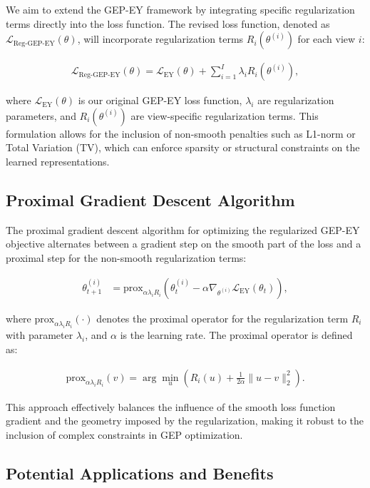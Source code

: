 We aim to extend the GEP-EY framework by integrating specific regularization terms directly into the loss function. The revised loss function, denoted as $\mathcal{L}_{\text{Reg-GEP-EY}}(\theta)$, will incorporate regularization terms $R_i(\theta^{(i)})$ for each view $i$:

\begin{align}
    \mathcal{L}_{\text{Reg-GEP-EY}}(\theta) = \mathcal{L}_{\text{EY}}(\theta) + \sum_{i=1}^I \lambda_i R_i(\theta^{(i)}),
\end{align}

where $\mathcal{L}_{\text{EY}}(\theta)$ is our original GEP-EY loss function, $\lambda_i$ are regularization parameters, and $R_i(\theta^{(i)})$ are view-specific regularization terms. This formulation allows for the inclusion of non-smooth penalties such as L1-norm or Total Variation (TV), which can enforce sparsity or structural constraints on the learned representations.

\subsection{Proximal Gradient Descent Algorithm}

The proximal gradient descent algorithm for optimizing the regularized GEP-EY objective alternates between a gradient step on the smooth part of the loss and a proximal step for the non-smooth regularization terms:

\begin{align}
\theta^{(i)}_{t+1} &= \text{prox}_{\alpha \lambda_i R_i}\left(\theta^{(i)}_t - \alpha \nabla_{\theta^{(i)}} \mathcal{L}_{\text{EY}}(\theta_t)\right),
\end{align}

where $\text{prox}_{\alpha \lambda_i R_i}(\cdot)$ denotes the proximal operator for the regularization term $R_i$ with parameter $\lambda_i$, and $\alpha$ is the learning rate. The proximal operator is defined as:

\begin{align}
\text{prox}_{\alpha \lambda_i R_i}(v) = \arg \min_u \left( R_i(u) + \frac{1}{2\alpha} \|u - v\|_2^2 \right).
\end{align}

This approach effectively balances the influence of the smooth loss function gradient and the geometry imposed by the regularization, making it robust to the inclusion of complex constraints in GEP optimization.

\subsection{Potential Applications and Benefits}

